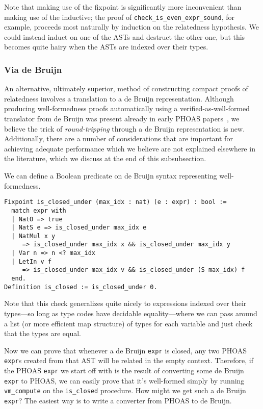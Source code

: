 Note that making use of the fixpoint is significantly more inconvenient than making use of the inductive; the proof of \texttt{check_is_even_expr_sound}, for example, proceeds most naturally by induction on the relatedness hypothesis.
We could instead induct on one of the ASTs and destruct the other one, but this becomes quite hairy when the ASTs are indexed over their types.


\subsubsection{Via de Bruijn} \label{sec:wf:perf:de-bruijn}

An alternative, ultimately superior, method of constructing compact proofs of relatedness involves a translation to a de Bruijn representation.
Although producing well-formedness proofs automatically using a verified-as-well-formed translator from de Bruijn was present already in early PHOAS papers~\cite{ImpurePOPL10}, we believe the trick of \emph{round-tripping} through a de Bruijn representation is new.
Additionally, there are a number of considerations that are important for achieving adequate performance which we believe are not explained elsewhere in the literature, which we discuss at the end of this subsubsection.

We can define a Boolean predicate on de Bruijn syntax representing well-formedness.
\begin{verbatim}
Fixpoint is_closed_under (max_idx : nat) (e : expr) : bool :=
  match expr with
  | NatO => true
  | NatS e => is_closed_under max_idx e
  | NatMul x y
     => is_closed_under max_idx x && is_closed_under max_idx y
  | Var n => n <? max_idx
  | LetIn v f
     => is_closed_under max_idx v && is_closed_under (S max_idx) f
  end.
Definition is_closed := is_closed_under 0.
\end{verbatim}
Note that this check generalizes quite nicely to expressions indexed over their types---so long as type codes have decidable equality---where we can pass around a list (or more efficient map structure) of types for each variable and just check that the types are equal.

Now we can prove that whenever a de Bruijn \texttt{expr} is closed, any two PHOAS \texttt{expr}s created from that AST will be related in the empty context.
Therefore, if the PHOAS \texttt{expr} we start off with is the result of converting some de Bruijn \texttt{expr} to PHOAS, we can easily prove that it's well-formed simply by running \texttt{vm_compute} on the \texttt{is_closed} procedure.
How might we get such a de Bruijn \texttt{expr}?
The easiest way is to write a converter from PHOAS to de Bruijn.

